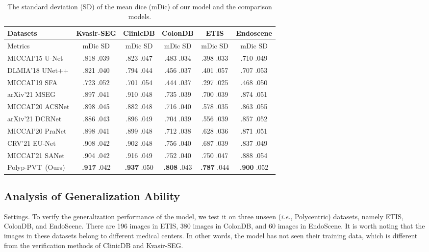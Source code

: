 \documentclass[journal]{IEEEtran}
\def\ourmodel{Polyp-PVT}
\begin{document}
\begin{table*}[t!]
  \centering
  \small
  \caption{The standard deviation (SD) of the mean dice (mDic) of our model and the comparison models.}
  \vspace{-5pt}
  \setlength\tabcolsep{16pt}
	\renewcommand{\arraystretch}{1}
    \begin{tabular}{l|c|c|c|c|c}
    \hline 
    Datasets &Kvasir-SEG & ClinicDB &ColonDB & ETIS & Endoscene \\
    \hline 
    Metrics& mDic  SD    & mDic  SD    & mDic   SD    & mDic   SD    & mDic   SD \\
    \hline 
    MICCAI'15 U-Net  & .818  .039  & .823   .047  & .483   .034  & .398    .033  & .710    .049  \\
    DLMIA'18 UNet++ & .821   .040  & .794  .044  & .456    .037  & .401    .057  & .707    .053  \\
    MICCAI'19 SFA    & .723   .052  & .701   .054  & .444    .037  & .297    .025  & .468    .050  \\
    arXiv'21 MSEG  & .897    .041  & .910    .048  & .735    .039  & .700    .039  & .874    .051  \\
    MICCAI'20 ACSNet & .898    .045  & .882    .048  & .716    .040  & .578    .035  & .863   .055  \\
    arXiv'21 DCRNet & .886    .043  & .896    .049  & .704    .039  & .556    .039  & .857    .052  \\
    MICCAI'20 PraNet & .898    .041  & .899    .048  & .712    .038  & .628   .036  & .871    .051  \\
    CRV'21 EU-Net & .908   .042  & .902    .048  & .756   .040  & .687   .039  & .837    .049  \\
    MICCAI'21 SANet & .904   .042  & .916    .049  & .752    .040  & .750    .047  & .888    .054  \\
    \hline 
    \rowcolor{gray!30}
    \ourmodel~(Ours) & \textbf{.917}    .042  & \textbf{.937}    .050  & \textbf{.808}    .043  & \textbf{.787}    .044  & \textbf{.900}   .052  \\
    \hline 
    \end{tabular}\label{tab:sd}\end{table*}

\subsection{Analysis of Generalization Ability}
\textcolor[RGB]{31,100,212}{Settings.} To verify the generalization performance of the model, we test it on three unseen (\emph{i.e.}, Polycentric) datasets, namely ETIS, ColonDB, and EndoScene.
There are 196 images in ETIS, 380 images in ColonDB, and 60 images in EndoScene.  
It is worth noting that the images in these datasets belong to different medical centers. In other words, the model has not seen their training data, which is different from the verification methods of ClinicDB and Kvasir-SEG.
\end{document}
